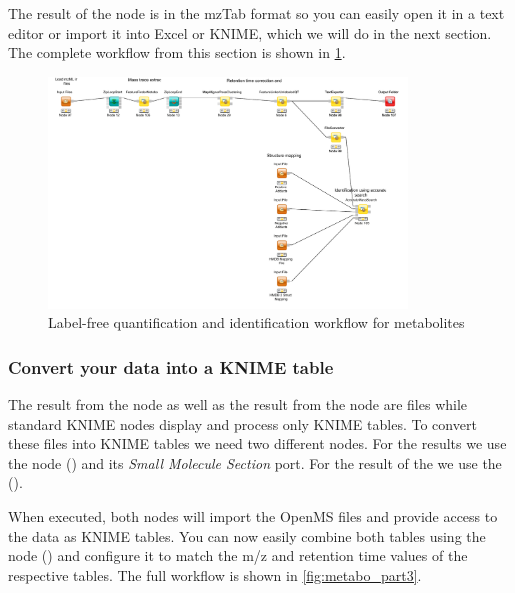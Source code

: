 The result of the  node is in the mzTab format \cite{Griss2014} so you can easily open it in a text editor or import it into Excel or KNIME, which we will do in the next section.
The complete workflow from this section is shown in \cref{fig:metabo_part2}.

\begin{figure}[htbp]
  \centering
  \includegraphics[width=0.85\textwidth]{graphics/metabo/metabo_part2}
  \caption{Label-free quantification and identification workflow for metabolites}
  \label{fig:metabo_part2}
\end{figure}

\subsubsection{Convert your data into a KNIME table}

The result from the  node as well as the result from the  node are files while standard KNIME nodes display and process only KNIME tables. To convert these files into KNIME tables we need two different nodes.
For the  results we use the  node () and its \textit{Small Molecule Section} port. For the result of the  we use the  ().

When executed, both nodes will import the OpenMS files and provide access to the data as KNIME tables.
You can now easily combine both tables using the  node () and configure it to match the m/z and retention time values of the respective tables.
The full workflow is shown in \cref{fig:metabo_part3}.

